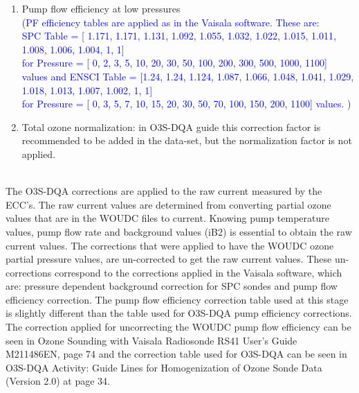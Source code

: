 \documentclass{article}
\begin{document}
\begin{enumerate}
        \item Pump flow efficiency at low pressures\\
        (\textcolor{blue}{PF efficiency tables are applied as in the Vaisala software.
        These are:\\
SPC Table = [ 1.171, 1.171, 1.131, 1.092, 1.055, 1.032, 1.022, 1.015, 1.011, 1.008, 1.006, 1.004,    1,    1]\\
         for Pressure  =    [    0,     2,     3,      5,    10,    20,    30,    50,   100,   200,   300,   500, 1000, 1100] values and
        ENSCI Table = [1.24, 1.24, 1.124, 1.087, 1.066, 1.048, 1.041, 1.029, 1.018, 1.013,  1.007, 1.002,     1,    1]\\
        for Pressure = [   0,    3,     5,     7,    10,    15,    20,    30,    50,    70,    100,   150,   200, 1100] values.
 })\\
        \item Total ozone normalization: in O3S-DQA guide this correction factor is recommended to be added in the data-set,
        but the normalization factor is not applied.\\
          \\
\end{enumerate}

The O3S-DQA corrections are applied to the raw current measured by the ECC's. The raw current values are
determined from converting partial ozone values that are
in the WOUDC files to current. Knowing pump temperature values, pump flow rate and background values (iB2) is essential
to obtain the raw current values.
The corrections that were applied to have the WOUDC ozone partial pressure values, are un-corrected to
get the raw current values. These un-corrections correspond to the corrections applied in the Vaisala software, which are:
pressure dependent background correction for SPC sondes and pump flow
efficiency correction. The pump flow efficiency correction table used at this stage is slightly different than the table used
for O3S-DQA pump efficiency corrections.
The correction applied for uncorrecting the WOUDC pump flow efficiency can be seen in Ozone Sounding with Vaisala
Radiosonde RS41 User's Guide M211486EN, page 74 and the correction table
used for O3S-DQA can be seen in O3S-DQA Activity: Guide Lines for Homogenization of Ozone Sonde Data (Version 2.0)
at page 34.
\end{document}
